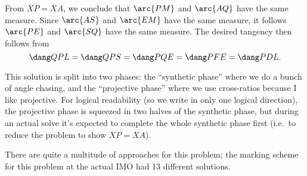 From $XP = XA$, we conclude that $\arc{PM}$ and $\arc{AQ}$ have the same measure.
Since $\arc{AS}$ and $\arc{EM}$ have the same measure,
it follows $\arc{PE}$ and $\arc{SQ}$ have the same measure.
The desired tangency then follows from
\[ \dang QPL = \dang QPS = \dang PQE = \dang PFE = \dang PDL. \]

\begin{remark*}
  This solution is split into two phases:
  the ``synthetic phase'' where we do a bunch of angle chasing, and the
  ``projective phase'' where we use cross-ratios because I like projective.
  For logical readability (so we write in only one logical direction),
  the projective phase is squeezed in two halves of the synthetic phase,
  but during an actual solve it's expected to complete
  the whole synthetic phase first (i.e.\ to reduce the problem to show $XP=XA$).
\end{remark*}

\begin{remark*}
  There are quite a multitude of approaches for this problem;
  the marking scheme for this problem at the actual IMO had 13 different solutions.
\end{remark*}
